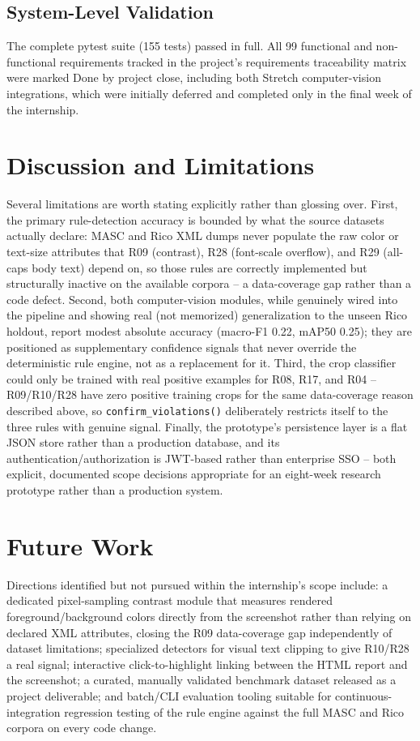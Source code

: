 \documentclass[10pt,conference]{IEEEtran}
\begin{document}
\subsection{System-Level Validation}
The complete pytest suite (155 tests) passed in full. All 99 functional and non-functional requirements tracked in the project's requirements traceability matrix were marked Done by project close, including both Stretch computer-vision integrations, which were initially deferred and completed only in the final week of the internship.

\section{Discussion and Limitations}

Several limitations are worth stating explicitly rather than glossing over. First, the primary rule-detection accuracy is bounded by what the source datasets actually declare: MASC and Rico XML dumps never populate the raw color or text-size attributes that R09 (contrast), R28 (font-scale overflow), and R29 (all-caps body text) depend on, so those rules are correctly implemented but structurally inactive on the available corpora -- a data-coverage gap rather than a code defect. Second, both computer-vision modules, while genuinely wired into the pipeline and showing real (not memorized) generalization to the unseen Rico holdout, report modest absolute accuracy (macro-F1 0.22, mAP50 0.25); they are positioned as supplementary confidence signals that never override the deterministic rule engine, not as a replacement for it. Third, the crop classifier could only be trained with real positive examples for R08, R17, and R04 -- R09/R10/R28 have zero positive training crops for the same data-coverage reason described above, so \texttt{confirm\_violations()} deliberately restricts itself to the three rules with genuine signal. Finally, the prototype's persistence layer is a flat JSON store rather than a production database, and its authentication/authorization is JWT-based rather than enterprise SSO -- both explicit, documented scope decisions appropriate for an eight-week research prototype rather than a production system.

\section{Future Work}

Directions identified but not pursued within the internship's scope include: a dedicated pixel-sampling contrast module that measures rendered foreground/background colors directly from the screenshot rather than relying on declared XML attributes, closing the R09 data-coverage gap independently of dataset limitations; specialized detectors for visual text clipping to give R10/R28 a real signal; interactive click-to-highlight linking between the HTML report and the screenshot; a curated, manually validated benchmark dataset released as a project deliverable; and batch/CLI evaluation tooling suitable for continuous-integration regression testing of the rule engine against the full MASC and Rico corpora on every code change.
\end{document}

